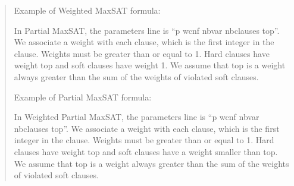 \documentclass[letterpaper,10pt,openany,oneside,english]{sphinxmanual}
\begin{document}
\begin{quote}
\sphinxAtStartPar
Example of Weighted Max\sphinxhyphen{}SAT formula:

\begin{sphinxVerbatim}[commandchars=\\\{\}]
   
   
   
    
   
   
\end{sphinxVerbatim}

\sphinxAtStartPar
{}

\sphinxAtStartPar
In Partial Max\sphinxhyphen{}SAT, the parameters line is “p wcnf nbvar nbclauses top”. We associate a weight with each clause, which is the first integer in the clause. Weights must be greater than or equal to 1. Hard clauses have weight top and soft clauses have weight 1. We assume that top is a weight always greater than the sum of the weights of violated soft clauses.

\sphinxAtStartPar
Example of Partial Max\sphinxhyphen{}SAT formula:

\begin{sphinxVerbatim}[commandchars=\\\{\}]
   
    
    
    
   
   
   
\end{sphinxVerbatim}

\sphinxAtStartPar
{}

\sphinxAtStartPar
In Weighted Partial Max\sphinxhyphen{}SAT, the parameters line is “p wcnf nbvar nbclauses top”. We associate a weight with each clause, which is the first integer in the clause. Weights must be greater than or equal to 1. Hard clauses have weight top and soft clauses have a weight smaller than top. We assume that top is a weight always greater than the sum of the weights of violated soft clauses.


\end{quote}
\end{document}
